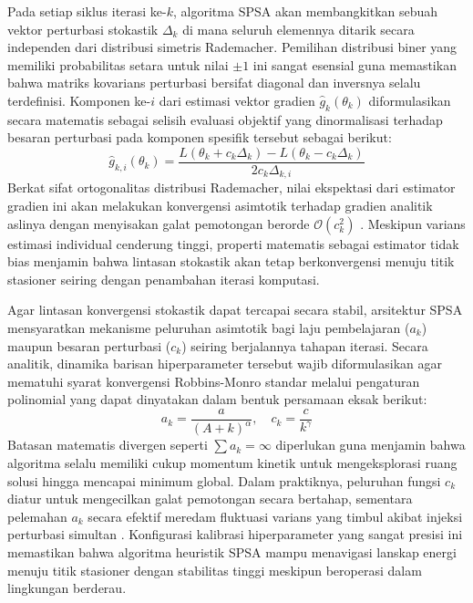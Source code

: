 Pada setiap siklus iterasi ke-$k$, algoritma SPSA akan membangkitkan sebuah vektor perturbasi stokastik $\Delta_k$ di mana seluruh elemennya ditarik secara independen dari distribusi simetris Rademacher. Pemilihan distribusi biner yang memiliki probabilitas setara untuk nilai $\pm 1$ ini sangat esensial guna memastikan bahwa matriks kovarians perturbasi bersifat diagonal dan inversnya selalu terdefinisi. Komponen ke-$i$ dari estimasi vektor gradien $\hat{g}_{k}(\theta_k)$ diformulasikan secara matematis sebagai selisih evaluasi objektif yang dinormalisasi terhadap besaran perturbasi pada komponen spesifik tersebut sebagai berikut:
\begin{equation}
\hat{g}_{k,i}(\theta_k) = \frac{L(\theta_k + c_k \Delta_k) - L(\theta_k - c_k \Delta_k)}{2 c_k \Delta_{k,i}}
\end{equation}
Berkat sifat ortogonalitas distribusi Rademacher, nilai ekspektasi dari estimator gradien ini akan melakukan konvergensi asimtotik terhadap gradien analitik aslinya dengan menyisakan galat pemotongan berorde $\mathcal{O}(c_k^2)$ \cite{spall_implementation_1998}. Meskipun varians estimasi individual cenderung tinggi, properti matematis sebagai estimator tidak bias menjamin bahwa lintasan stokastik akan tetap berkonvergensi menuju titik stasioner seiring dengan penambahan iterasi komputasi.

Agar lintasan konvergensi stokastik dapat tercapai secara stabil, arsitektur SPSA mensyaratkan mekanisme peluruhan asimtotik bagi laju pembelajaran ($a_k$) maupun besaran perturbasi ($c_k$) seiring berjalannya tahapan iterasi. Secara analitik, dinamika barisan hiperparameter tersebut wajib diformulasikan agar mematuhi syarat konvergensi Robbins-Monro standar melalui pengaturan polinomial yang dapat dinyatakan dalam bentuk persamaan eksak berikut:
\begin{equation}
a_k = \frac{a}{(A + k)^\alpha}, \quad c_k = \frac{c}{k^\gamma}
\end{equation}
Batasan matematis divergen seperti $\sum a_k = \infty$ diperlukan guna menjamin bahwa algoritma selalu memiliki cukup momentum kinetik untuk mengeksplorasi ruang solusi hingga mencapai minimum global. Dalam praktiknya, peluruhan fungsi $c_k$ diatur untuk mengecilkan galat pemotongan secara bertahap, sementara pelemahan $a_k$ secara efektif meredam fluktuasi varians yang timbul akibat injeksi perturbasi simultan \cite{spall_implementation_1998}. Konfigurasi kalibrasi hiperparameter yang sangat presisi ini memastikan bahwa algoritma heuristik SPSA mampu menavigasi lanskap energi menuju titik stasioner dengan stabilitas tinggi meskipun beroperasi dalam lingkungan berderau.

